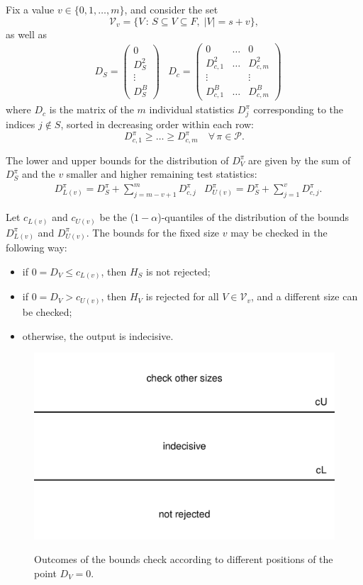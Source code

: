 \documentclass[11pt,a4paper,openright,twoside]{article}
\begin{document}
Fix a value $v\in\{0,1,\ldots,m\}$, and consider the set
\[\mathcal{V}_v=\{V\,:\,S\subseteq V\subseteq F,\;|V|=s+v\},\]
as well as
\begin{align*}
&D_S =
\begin{pmatrix}
0\\
D_S^2\\
\vdots\\
D_S^B
\end{pmatrix}
&D_{c} =
\begin{pmatrix}
0 & \ldots & 0\\
D_{c,1}^{2} & \ldots & D_{c,m}^{2}\\
\vdots &  & \vdots\\
D_{c,1}^{B} & \ldots & D_{c,m}^{B}
\end{pmatrix}
\end{align*}
where $D_{c}$ is the matrix of the $m$ individual statistics $D_j^{\pi}$ corresponding to the indices $j\notin S$, sorted in decreasing order within each row: 
\[D_{c,1}^{\pi}\geq\ldots\geq D_{c,m}^{\pi}\quad\forall\,\pi\in\mathcal{P}.\]

The lower and upper bounds for the distribution of $D_V^{\pi}$ are given by the sum of $D_S^{\pi}$ and the $v$ smaller and higher remaining test statistics:
\begin{align*}
& D_{L(v)}^{\pi}=D_S^{\pi}+\sum_{j=m-v+1}^{m} D_{c,j}^{\pi} & D_{U(v)}^{\pi}=D_S^{\pi}+\sum_{j=1}^{v} D_{c,j}^{\pi}.
\end{align*}

Let $c_{L(v)}$ and $c_{U(v)}$ be the ($1-\alpha$)-quantiles of the distribution of the bounds $D_{L(v)}^{\pi}$ and $D_{U(v)}^{\pi}$. The bounds for the fixed size $v$ may be checked in the following way:
\begin{itemize}
\item if $0=D_V\leq c_{L(v)}$, then $H_S$ is not rejected;
\item if $0=D_V > c_{U(v)}$, then $H_V$ is rejected for all $V\in\mathcal{V}_v$, and a different size can be checked;
\item otherwise, the output is indecisive.
\end{itemize}

\begin{figure}[h!]
\centering
\includegraphics[scale=0.5]{test_areas.pdf}
\label{test_areas}
\caption{Outcomes of the bounds check according to different positions of the point $D_V=0$.}
\end{figure}
\end{document}
